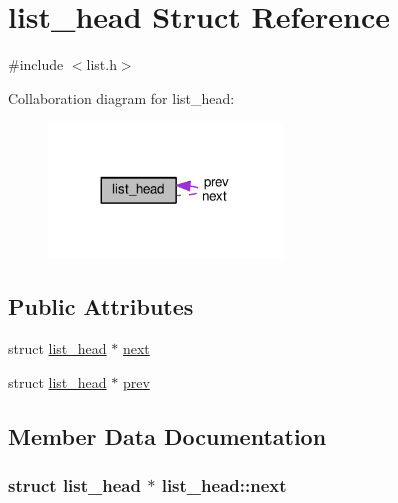\hypertarget{structlist__head}{}\section{list\+\_\+head Struct Reference}
\label{structlist__head}


{\ttfamily \#include $<$list.\+h$>$}



Collaboration diagram for list\+\_\+head\+:\nopagebreak
\begin{figure}[H]
\begin{center}
\leavevmode
\includegraphics[width=176pt]{structlist__head__coll__graph}
\end{center}
\end{figure}
\subsection*{Public Attributes}
\begin{DoxyCompactItemize}
\item 
struct \hyperlink{structlist__head}{list\+\_\+head} $\ast$ \hyperlink{structlist__head_a44b2d28c78f7266869b3f00390bec772}{next}
\item 
struct \hyperlink{structlist__head}{list\+\_\+head} $\ast$ \hyperlink{structlist__head_aaa0eabda8877e1d6de73a33f223ad004}{prev}
\end{DoxyCompactItemize}


\subsection{Member Data Documentation}
\subsubsection[{\texorpdfstring{next}{next}}]{\setlength{\rightskip}{0pt plus 5cm}struct {\bf list\+\_\+head} $\ast$ list\+\_\+head\+::next}\hypertarget{structlist__head_a44b2d28c78f7266869b3f00390bec772}{}\label{structlist__head_a44b2d28c78f7266869b3f00390bec772}
